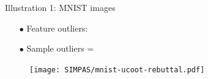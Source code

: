 \documentclass{beamer}
\begin{document}
\begin{frame}{Illustration 1: MNIST images}
\scriptsize
\begin{itemize}
  \item[$\bullet$] Feature outliers:
  \item[$\bullet$] Sample outliers =
\end{itemize}
\vspace{-0.5cm}
\begin{figure}
    \centering
    \texttt{[image: SIMPAS/mnist-ucoot-rebuttal.pdf]}
    \vspace*{-1cm}
\end{figure}


\end{frame}
\end{document}
